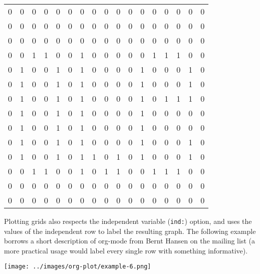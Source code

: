 \documentclass[11pt]{article}
\begin{document}
\begin{center}
\begin{tabular}{rrrrrrrrrrrrrrrrr}
0 & 0 & 0 & 0 & 0 & 0 & 0 & 0 & 0 & 0 & 0 & 0 & 0 & 0 & 0 & 0 & 0\\
0 & 0 & 0 & 0 & 0 & 0 & 0 & 0 & 0 & 0 & 0 & 0 & 0 & 0 & 0 & 0 & 0\\
0 & 0 & 0 & 0 & 0 & 0 & 0 & 0 & 0 & 0 & 0 & 0 & 0 & 0 & 0 & 0 & 0\\
0 & 0 & 1 & 1 & 0 & 0 & 1 & 0 & 0 & 0 & 0 & 0 & 1 & 1 & 1 & 0 & 0\\
0 & 1 & 0 & 0 & 1 & 0 & 1 & 0 & 0 & 0 & 0 & 1 & 0 & 0 & 0 & 1 & 0\\
0 & 1 & 0 & 0 & 1 & 0 & 1 & 0 & 0 & 0 & 0 & 1 & 0 & 0 & 0 & 1 & 0\\
0 & 1 & 0 & 0 & 1 & 0 & 1 & 0 & 0 & 0 & 0 & 1 & 0 & 1 & 1 & 1 & 0\\
0 & 1 & 0 & 0 & 1 & 0 & 1 & 0 & 0 & 0 & 0 & 1 & 0 & 0 & 0 & 0 & 0\\
0 & 1 & 0 & 0 & 1 & 0 & 1 & 0 & 0 & 0 & 0 & 1 & 0 & 0 & 0 & 0 & 0\\
0 & 1 & 0 & 0 & 1 & 0 & 1 & 0 & 0 & 0 & 0 & 1 & 0 & 0 & 0 & 1 & 0\\
0 & 1 & 0 & 0 & 1 & 0 & 1 & 1 & 0 & 1 & 0 & 1 & 0 & 0 & 0 & 1 & 0\\
0 & 0 & 1 & 1 & 0 & 0 & 1 & 0 & 1 & 1 & 0 & 0 & 1 & 1 & 1 & 0 & 0\\
0 & 0 & 0 & 0 & 0 & 0 & 0 & 0 & 0 & 0 & 0 & 0 & 0 & 0 & 0 & 0 & 0\\
0 & 0 & 0 & 0 & 0 & 0 & 0 & 0 & 0 & 0 & 0 & 0 & 0 & 0 & 0 & 0 & 0\\
\end{tabular}
\end{center}

Plotting grids also respects the independent variable (\texttt{ind:}) option,
and uses the values of the independent row to label the resulting
graph.  The following example borrows a short description of org-mode
from Bernt Hansen on the mailing list (a more practical usage would
label every single row with something informative).

\begin{center}
\texttt{[image: ../images/org-plot/example-6.png]}
\end{center}
\end{document}

